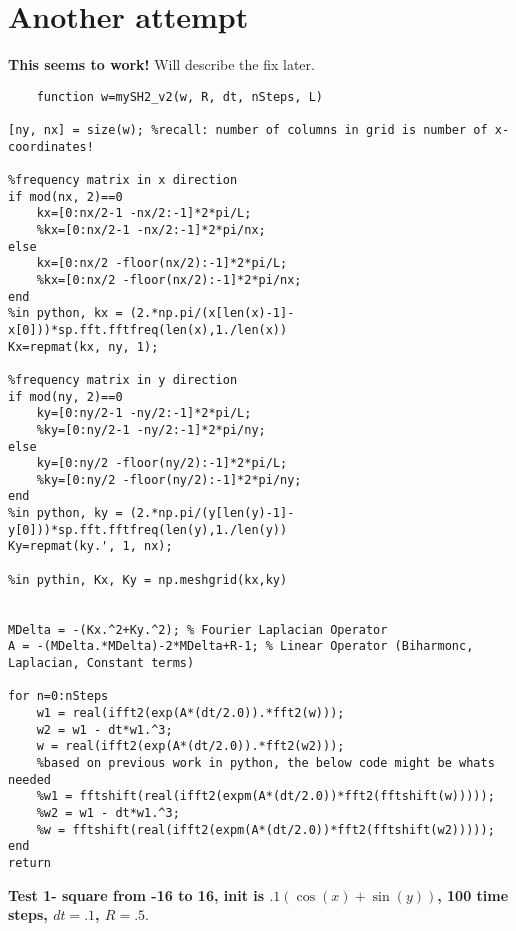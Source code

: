 \documentclass[12pt]{article}
\begin{document}
\section{Another attempt}
\textbf{This seems to work!} Will describe the fix later.
\begin{verbatim}
    function w=mySH2_v2(w, R, dt, nSteps, L)

[ny, nx] = size(w); %recall: number of columns in grid is number of x-coordinates!

%frequency matrix in x direction
if mod(nx, 2)==0
    kx=[0:nx/2-1 -nx/2:-1]*2*pi/L;
    %kx=[0:nx/2-1 -nx/2:-1]*2*pi/nx;
else
    kx=[0:nx/2 -floor(nx/2):-1]*2*pi/L;
    %kx=[0:nx/2 -floor(nx/2):-1]*2*pi/nx;
end
%in python, kx = (2.*np.pi/(x[len(x)-1]-x[0]))*sp.fft.fftfreq(len(x),1./len(x))
Kx=repmat(kx, ny, 1);

%frequency matrix in y direction
if mod(ny, 2)==0
    ky=[0:ny/2-1 -ny/2:-1]*2*pi/L;
    %ky=[0:ny/2-1 -ny/2:-1]*2*pi/ny;
else
    ky=[0:ny/2 -floor(ny/2):-1]*2*pi/L;
    %ky=[0:ny/2 -floor(ny/2):-1]*2*pi/ny;
end
%in python, ky = (2.*np.pi/(y[len(y)-1]-y[0]))*sp.fft.fftfreq(len(y),1./len(y))
Ky=repmat(ky.', 1, nx);

%in pythin, Kx, Ky = np.meshgrid(kx,ky)


MDelta = -(Kx.^2+Ky.^2); % Fourier Laplacian Operator
A = -(MDelta.*MDelta)-2*MDelta+R-1; % Linear Operator (Biharmonc, Laplacian, Constant terms)

for n=0:nSteps
    w1 = real(ifft2(exp(A*(dt/2.0)).*fft2(w)));
    w2 = w1 - dt*w1.^3;
    w = real(ifft2(exp(A*(dt/2.0)).*fft2(w2)));
    %based on previous work in python, the below code might be whats needed
    %w1 = fftshift(real(ifft2(expm(A*(dt/2.0))*fft2(fftshift(w)))));
    %w2 = w1 - dt*w1.^3;
    %w = fftshift(real(ifft2(expm(A*(dt/2.0))*fft2(fftshift(w2)))));
end
return
\end{verbatim}
\textbf{Test 1- square from -16 to 16, init is $.1(\cos(x)+\sin(y))$, 100 time steps, $dt=.1$, $R=.5$}.
\end{document}
